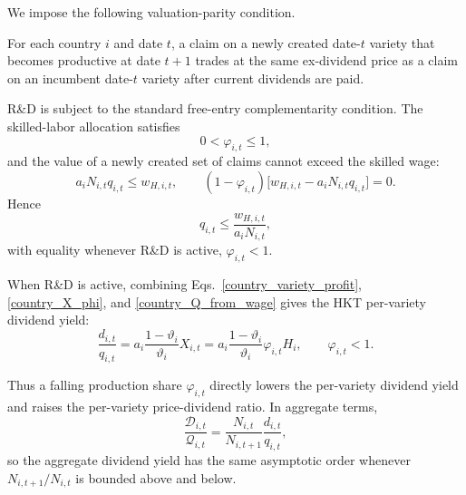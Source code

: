 \documentclass{article}
\def\green#1{#1}%
\begin{document}
We impose the following valuation-parity condition.

\begin{ass}\label{ass_entry_valuation}
For each country $i$ and date $t$, a claim on a newly created date-$t$ variety that becomes productive at date $t+1$ trades at the same ex-dividend price as a claim on an incumbent date-$t$ variety after current dividends are paid.
\end{ass}

R\&D \green{is subject to the standard free-entry complementarity condition}.  \green{The skilled-labor allocation satisfies}
\[
\green{0<\varphi}_{i,t}\green{\le 1},
\]
\green{and the value of a newly created set of} claims \green{cannot exceed} the \green{skilled wage}:
\begin{equation}\label{country_Q_from_wage}
a_iN_{i,t}q_{i,t}\green{\le} w_{H,i,t},
\qquad
(\green{1-\varphi}_{i,t})
\bigl[w_{H,i,t}\green{-}a_iN_{i,t}\green{q}_{\green{i},\green{t}}\bigr]\green{=0}.
\end{equation}
\green{Hence}
\[
\green{q}_{\green{i},\green{t}}\green{\le} \frac{\green{w}_{\green{H},\green{i},\green{t}}}{\green{a}_\green{iN}_{\green{i},\green{t}}},
\]
\green{with equality whenever R}\&\green{D is active}, $\green{\varphi}_{\green{i},\green{t}}\green{<1}$.

\green{When R}\&\green{D is active}, \green{combining} Eqs.~\eqref{country_variety_profit}, \eqref{country_X_phi}, and \eqref{country_Q_from_wage} gives the HKT per-variety dividend yield:
\begin{equation}\label{country_dividend_yield}
\frac{d_{i,t}}{q_{i,t}}
=
a_i\frac{1-\vartheta_i}{\vartheta_i}X_{i,t}
=
a_i\frac{1-\vartheta_i}{\vartheta_i}\varphi_{i,t}H_i,
\qquad \green{\varphi}_{\green{i},\green{t}}\green{<1}.
\end{equation}

Thus a falling production share $\varphi_{i,t}$ directly lowers the per-variety dividend yield and raises the per-variety price-dividend ratio. In aggregate terms,
\[
\frac{\mathcal D_{i,t}}{\mathcal Q_{i,t}}
=
\frac{N_{i,t}}{N_{i,t+1}}\frac{d_{i,t}}{q_{i,t}},
\]
so the aggregate dividend yield has the same asymptotic order whenever $N_{i,t+1}/N_{i,t}$ is bounded above and below.
\end{document}
